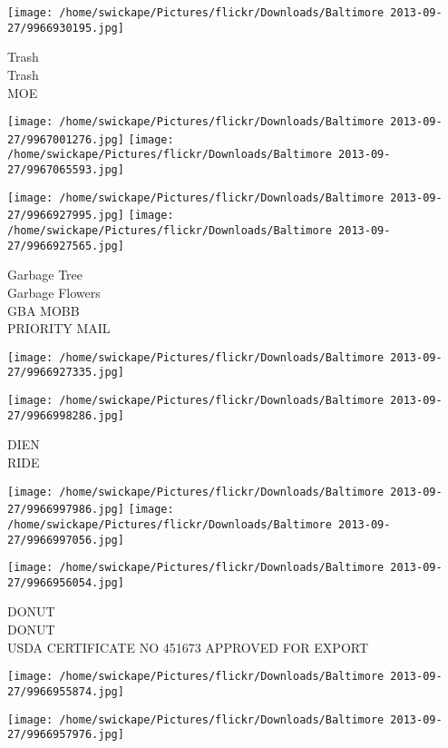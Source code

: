 \documentclass[10pt,letterpaper]{article}
\begin{document}
\vspace{0.25in}
\texttt{[image: /home/swickape/Pictures/flickr/Downloads/Baltimore 2013-09-27/9966930195.jpg]}

Trash\\
Trash\\
MOE
\pagebreak

\texttt{[image: /home/swickape/Pictures/flickr/Downloads/Baltimore 2013-09-27/9967001276.jpg]}
\texttt{[image: /home/swickape/Pictures/flickr/Downloads/Baltimore 2013-09-27/9967065593.jpg]}

\texttt{[image: /home/swickape/Pictures/flickr/Downloads/Baltimore 2013-09-27/9966927995.jpg]}
\texttt{[image: /home/swickape/Pictures/flickr/Downloads/Baltimore 2013-09-27/9966927565.jpg]}

Garbage Tree\\
Garbage Flowers\\
GBA MOBB\\
PRIORITY MAIL
\pagebreak

\texttt{[image: /home/swickape/Pictures/flickr/Downloads/Baltimore 2013-09-27/9966927335.jpg]}

\vspace{0.25in}
\texttt{[image: /home/swickape/Pictures/flickr/Downloads/Baltimore 2013-09-27/9966998286.jpg]}

DIEN\\
RIDE
\pagebreak

\texttt{[image: /home/swickape/Pictures/flickr/Downloads/Baltimore 2013-09-27/9966997986.jpg]}
\texttt{[image: /home/swickape/Pictures/flickr/Downloads/Baltimore 2013-09-27/9966997056.jpg]}

\vspace{0.25in}
\texttt{[image: /home/swickape/Pictures/flickr/Downloads/Baltimore 2013-09-27/9966956054.jpg]}

DONUT\\
DONUT\\
USDA CERTIFICATE NO 451673 APPROVED FOR EXPORT
\pagebreak

\texttt{[image: /home/swickape/Pictures/flickr/Downloads/Baltimore 2013-09-27/9966955874.jpg]}

\vspace{0.25in}
\texttt{[image: /home/swickape/Pictures/flickr/Downloads/Baltimore 2013-09-27/9966957976.jpg]}
\end{document}
